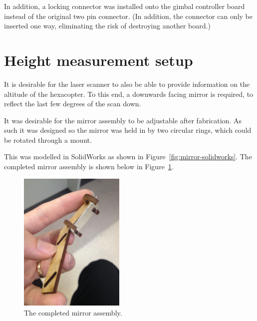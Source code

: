 \documentclass[12pt,oneside,a4paper,draft]{book}
\begin{document}
In addition, a locking connector was installed onto the gimbal
controller board instead of the original two pin connector. (In
addition, the connector can only be inserted one way, eliminating the
risk of destroying another board.)

\section{Height measurement setup}
\label{sec:height-meas-setup}

It is desirable for the laser scanner to also be able to provide
information on the altitude of the hexacopter. To this end, a
downwards facing mirror is required, to reflect the last few degrees
of the scan down.

It was desirable for the mirror assembly to be adjustable after
fabrication. As such it was designed so the mirror was held in by two
circular rings, which could be rotated through a mount.

This was modelled in SolidWorks as shown in
Figure~\ref{fig:mirror-solidworks}. The completed mirror assembly is shown below in
Figure~\ref{fig:mirror}.

\begin{figure}[h]
  \centering
  \includegraphics[width=0.45\textwidth]{figs/mirror}
  \caption{The completed mirror assembly.}
  \label{fig:mirror}
\end{figure}
\end{document}
